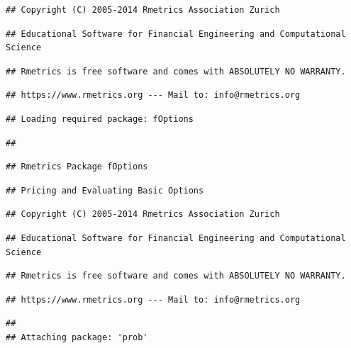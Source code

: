 \documentclass[]{article}
\begin{document}
\begin{verbatim}
## Copyright (C) 2005-2014 Rmetrics Association Zurich
\end{verbatim}

\begin{verbatim}
## Educational Software for Financial Engineering and Computational Science
\end{verbatim}

\begin{verbatim}
## Rmetrics is free software and comes with ABSOLUTELY NO WARRANTY.
\end{verbatim}

\begin{verbatim}
## https://www.rmetrics.org --- Mail to: info@rmetrics.org
\end{verbatim}

\begin{verbatim}
## Loading required package: fOptions
\end{verbatim}

\begin{verbatim}
## 
\end{verbatim}

\begin{verbatim}
## Rmetrics Package fOptions
\end{verbatim}

\begin{verbatim}
## Pricing and Evaluating Basic Options
\end{verbatim}

\begin{verbatim}
## Copyright (C) 2005-2014 Rmetrics Association Zurich
\end{verbatim}

\begin{verbatim}
## Educational Software for Financial Engineering and Computational Science
\end{verbatim}

\begin{verbatim}
## Rmetrics is free software and comes with ABSOLUTELY NO WARRANTY.
\end{verbatim}

\begin{verbatim}
## https://www.rmetrics.org --- Mail to: info@rmetrics.org
\end{verbatim}

\begin{verbatim}
## 
## Attaching package: 'prob'
\end{verbatim}
\end{document}
